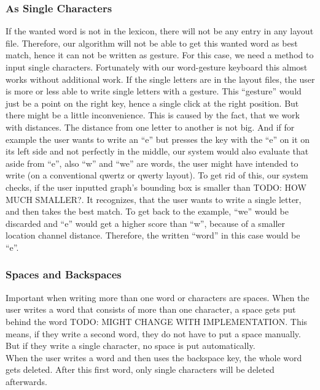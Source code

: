 \subsubsection{As Single Characters}
If the wanted word is not in the lexicon, there will not be any entry in any layout file. Therefore, our algorithm will not be able to get this wanted word as best match, hence it can not be written as gesture. For this case, we need a method to input single characters. Fortunately with our word-gesture keyboard this almost works without additional work. If the single letters are in the layout files, the user is more or less able to write single letters with a gesture. This ``gesture'' would just be a point on the right key, hence a single click at the right position. But there might be a little inconvenience. This is caused by the fact, that we work with distances. The distance from one letter to another is not big. And if for example the user wants to write an ``e'' but presses the key with the ``e'' on it on its left side and not perfectly in the middle, our system would also evaluate that aside from ``e'', also ``w'' and ``we'' are words, the user might have intended to write (on a conventional qwertz or qwerty layout). To get rid of this, our system checks, if the user inputted graph's bounding box is smaller than TODO: HOW MUCH SMALLER?. It recognizes, that the user wants to write a single letter, and then takes the best match. To get back to the example, ``we'' would be discarded and ``e'' would get a higher score than ``w'', because of a smaller location channel distance. Therefore, the written ``word'' in this case would be ``e''.

\subsubsection{Spaces and Backspaces}
Important when writing more than one word or characters are spaces. When the user writes a word that consists of more than one character, a space gets put behind the word TODO: MIGHT CHANGE WITH IMPLEMENTATION. This means, if they write a second word, they do not have to put a space manually. But if they write a single character, no space is put automatically.\\
When the user writes a word and then uses the backspace key, the whole word gets deleted. After this first word, only single characters will be deleted afterwards.

